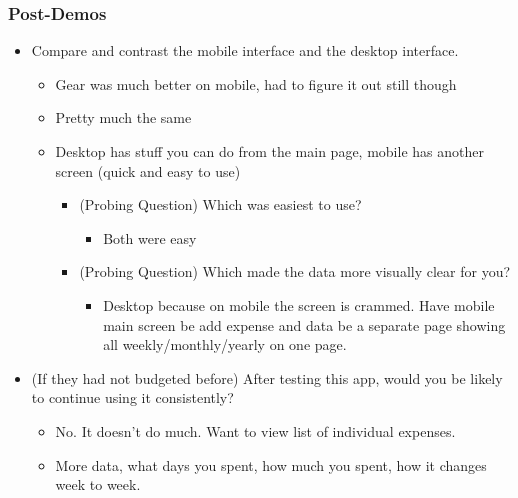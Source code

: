\documentclass{chi2011}
\begin{document}
	\subsubsection{Post-Demos}
	\begin{itemize}[noitemsep]
		\item Compare and contrast the mobile interface and the desktop interface.
		\begin{itemize}[noitemsep]
			\item Gear was much better on mobile, had to figure it out still though
			\item Pretty much the same
			\item Desktop has stuff you can do from the main page, mobile has another screen (quick and easy to
				  use)
			\begin{itemize}[noitemsep]
				\item (Probing Question) Which was easiest to use?
				\begin{itemize}[noitemsep]
					\item Both were easy
				\end{itemize}
			\item (Probing Question) Which made the data more visually clear for you?
				\begin{itemize}[noitemsep]
					\item Desktop because on mobile the screen is crammed. Have mobile main screen be add expense and data be a separate page showing all 
						  weekly/monthly/yearly on one page.
				\end{itemize}
			\end{itemize}
		\end{itemize}

		\item (If they had not budgeted before) After testing this app, would you be likely to continue using it consistently? 
		\begin{itemize}[noitemsep]
			\item No. It doesn't do much. Want to view list of individual expenses.
			\item More data, what days you spent, how much you spent, how it changes week to week.
		\end{itemize}
	\end{itemize}



\end{document}
